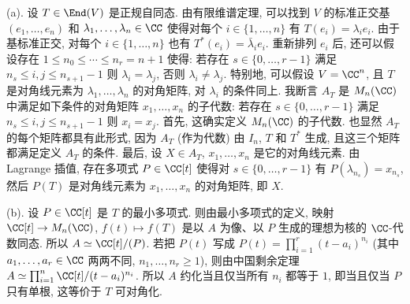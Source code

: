\begin{solution}
(a). 设 $T \in \End(V)$ 是正规自同态. 由有限维谱定理, 可以找到 $V$ 的标准正交基 $(e_1, \ldots, e_n)$ 和 $\lambda_1, \ldots, \lambda_n \in \CC$ 使得对每个 $i \in \{1, \ldots, n\}$ 有 $T(e_i) = \lambda_ie_i$. 由于基标准正交, 对每个 $i \in \{1, \ldots, n\}$ 也有 $T^*(e_i) = \bar{\lambda}_ie_i$. 重新排列 $e_i$ 后, 还可以假设存在 $1 \leq n_0 \leq \cdots \leq n_r = n+1$ 使得: 若存在 $s \in \{0, \ldots, r-1\}$ 满足 $n_s \leq i, j \leq n_{s+1} - 1$ 则 $\lambda_i = \lambda_j$, 否则 $\lambda_i \neq \lambda_j$.
特别地, 可以假设 $V = \CC^n$, 且 $T$ 是对角线元素为 $\lambda_1, \ldots, \lambda_n$ 的对角矩阵, 对 $\lambda_i$ 的条件同上. 我断言 $A_T$ 是 $M_n(\CC)$ 中满足如下条件的对角矩阵 $x_1, \ldots, x_n$ 的子代数: 若存在 $s \in \{0, \ldots, r-1\}$ 满足 $n_s \leq i, j \leq n_{s+1} - 1$ 则 $x_i = x_j$. 首先, 这确实定义 $M_n(\CC)$ 的子代数. 也显然 $A_T$ 的每个矩阵都具有此形式, 因为 $A_T$ (作为代数) 由 $I_n$, $T$ 和 $T^*$ 生成, 且这三个矩阵都满足定义 $A_T$ 的条件. 最后, 设 $X \in A_T$, $x_1, \ldots, x_n$ 是它的对角线元素. 由 Lagrange 插值, 存在多项式 $P \in \CC[t]$ 使得对 $s \in \{0, \ldots, r-1\}$ 有 $P(\lambda_{n_s}) = x_{n_s}$, 然后 $P(T)$ 是对角线元素为 $x_1, \ldots, x_n$ 的对角矩阵, 即 $X$.

(b). 设 $P \in \CC[t]$ 是 $T$ 的最小多项式. 则由最小多项式的定义, 映射 $\CC[t] \to M_n(\CC)$, $f(t) \longmapsto f(T)$ 是以 $A$ 为像、以 $P$ 生成的理想为核的 $\CC$-代数同态. 所以 $A \simeq \CC[t]/(P)$. 若把 $P(t)$ 写成 $P(t) = \prod_{i=1}^r(t - a_i)^{n_i}$ (其中 $a_1, \ldots, a_r \in \CC$ 两两不同, $n_1, \ldots, n_r \geq 1$), 则由中国剩余定理 $A \simeq \prod_{i=1}^n \CC[t]/(t - a_i)^{n_i}$. 所以 $A$ 约化当且仅当所有 $n_i$ 都等于 $1$, 即当且仅当 $P$ 只有单根, 这等价于 $T$ 可对角化.


\end{solution}
